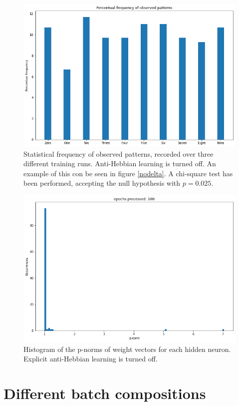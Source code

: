 \documentclass[a4paper]{report}
\begin{document}
\begin{figure} [H]
	\centering
	\includegraphics [width=12cm ] {o/bar1.png}
	\caption{Statistical frequency of observed patterns, recorded over three different training runs. Anti-Hebbian learning is turned off. An example of this con be seen in figure \ref{nodelta}. A chi-square test has been performed, accepting the null hypothesis with $p  = 0.025$.}
	\label{o/cerchio2}
\end{figure}

\begin{figure} [H]
	\centering
	\includegraphics [width=12cm ] {o/ii_hist.png}
	\caption{Histogram of the p-norms of weight vectors for each hidden neuron. Explicit anti-Hebbian learning is turned off.}
	\label{noh_hist}
\end{figure}

\section{Different batch compositions}
\end{document}
